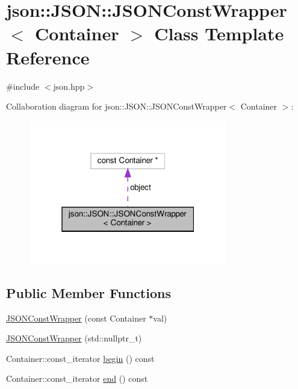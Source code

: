 \hypertarget{classjson_1_1_j_s_o_n_1_1_j_s_o_n_const_wrapper}{}\section{json\+:\+:J\+S\+ON\+:\+:J\+S\+O\+N\+Const\+Wrapper$<$ Container $>$ Class Template Reference}
\label{classjson_1_1_j_s_o_n_1_1_j_s_o_n_const_wrapper}


{\ttfamily \#include $<$json.\+hpp$>$}



Collaboration diagram for json\+:\+:J\+S\+ON\+:\+:J\+S\+O\+N\+Const\+Wrapper$<$ Container $>$\+:
\nopagebreak
\begin{figure}[H]
\begin{center}
\leavevmode
\includegraphics[width=244pt]{classjson_1_1_j_s_o_n_1_1_j_s_o_n_const_wrapper__coll__graph}
\end{center}
\end{figure}
\subsection*{Public Member Functions}
\begin{DoxyCompactItemize}
\item 
\mbox{\hyperlink{classjson_1_1_j_s_o_n_1_1_j_s_o_n_const_wrapper_ae7b5a3300a9ddb3149bc3195285c68ba}{J\+S\+O\+N\+Const\+Wrapper}} (const Container $\ast$val)
\item 
\mbox{\hyperlink{classjson_1_1_j_s_o_n_1_1_j_s_o_n_const_wrapper_a15614ff604d50f98bea39d340c6905fe}{J\+S\+O\+N\+Const\+Wrapper}} (std\+::nullptr\+\_\+t)
\item 
Container\+::const\+\_\+iterator \mbox{\hyperlink{classjson_1_1_j_s_o_n_1_1_j_s_o_n_const_wrapper_a29924543b1e49e7114d542de0a70a2d0}{begin}} () const
\item 
Container\+::const\+\_\+iterator \mbox{\hyperlink{classjson_1_1_j_s_o_n_1_1_j_s_o_n_const_wrapper_a6cb9ecc57758b150b2bb39cb763bdf57}{end}} () const
\end{DoxyCompactItemize}
